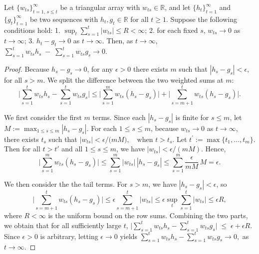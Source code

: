 \documentclass[10pt,a4paper]{amsart}
\begin{document}
\begin{lemma}
\label{lemma:Toeplitz}
Let $\{w_{ts}\}_{t=1,\,s \le t}^\infty$ be a triangular array with $w_{ts} \in \mathbb{R}$, 
and let $\{h_t\}_{t=1}^\infty$ and $\{g_t\}_{t=1}^\infty$ be two sequences with $h_t, g_t \in \mathbb{R}$ for all $t \ge 1$.
Suppose the following conditions hold:
1. $\displaystyle \sup_{t} \sum_{s=1}^t |w_{ts}| \le R < \infty$; 2. for each fixed $s$, $w_{ts} \to 0$ as $t \to \infty$; 3. $h_t - g_t \to 0$ as $t \to \infty$. 
Then, as $t \to \infty$, $\sum_{s=1}^t w_{ts} h_s \;-\; \sum_{s=1}^t w_{ts} g_s \to 0$.
\end{lemma}

\begin{proof}
 Because $h_s - g_s \to 0$, for any $\epsilon > 0$ there exists $m$ such that $|h_s - g_s| < \epsilon$, for all $s > m$. We split the difference between the two weighted sums at $m$:
\[
\Biggl|\sum_{s=1}^t w_{ts} h_s - \sum_{s=1}^t w_{ts} g_s \Biggr|
\le \Biggl|\sum_{s=1}^m w_{ts} (h_s-g_s)\Biggr|
   + \Biggl|\sum_{s=m+1}^t w_{ts} (h_s-g_s)\Biggr|.
\]

\noindent
We first consider the first $m$ terms. Since each $|h_s - g_s|$ is finite for $s \le m$, let $
M := \max_{1 \le s \le m} |h_s - g_s|. $
For each $1 \le s \le m$, because $w_{ts} \to 0$ as $t \to \infty$, there exists $t_s$ such that  $
|w_{ts}| <  {\epsilon}/({mM)}, \quad \text{when } t > t_s.$
Let $t^\prime := \max\{t_1, \dots, t_m\}$. Then for all $t > t'$ and all $1 \le s \le m$, we have $|w_{ts}| < \epsilon/(mM)$. Hence,
\[
\Biggl|\sum_{s=1}^m w_{ts} (h_s-g_s)\Biggr|
\le \sum_{s=1}^m |w_{ts}|\,|h_s-g_s|
\le \sum_{s=1}^m \frac{\epsilon}{mM}\,M = \epsilon.
\]

\noindent
We then consider the the tail terms. 
For $s > m$, we have $|h_s - g_s| < \epsilon$, so
\[
\Biggl|\sum_{s=m+1}^t w_{ts} (h_s-g_s)\Biggr|
\le \epsilon \sum_{s=m+1}^t |w_{ts}|
\le \epsilon \sup_{t}\sum_{s=1}^t |w_{ts}|
\le \epsilon R ,
\]
where $R < \infty$ is the uniform bound on the row sums. 
Combining the two parts, we obtain that for all sufficiently large $t$,
$ 
\Biggl|\sum_{s=1}^t w_{ts} h_s - \sum_{s=1}^t w_{ts} g_s\Biggr|
\;\le\; \epsilon + \epsilon R. $ 
Since $\epsilon > 0$ is arbitrary, letting $\epsilon \to 0$ yields
$ 
\sum_{s=1}^t w_{ts} h_s - \sum_{s=1}^t w_{ts} g_s \to 0, $ 
as $t \to \infty$.
\end{proof}
\end{document}

